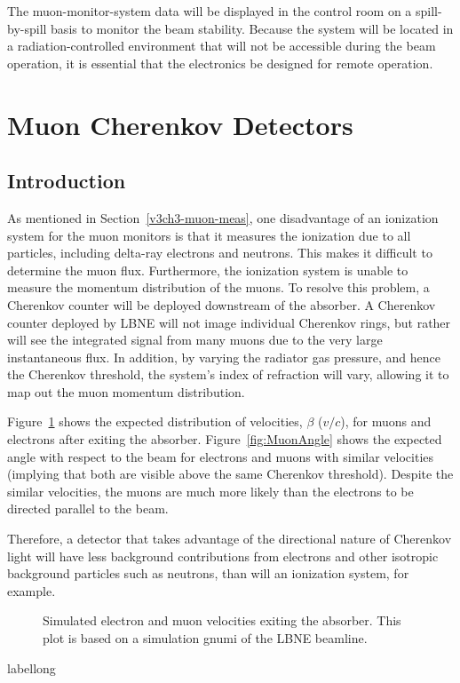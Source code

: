 The muon-monitor-system data will be displayed in the control room on
a spill-by-spill basis to monitor the beam stability. Because the
system will be located in a radiation-controlled environment that will
not be accessible during the beam operation, it is essential that the
electronics be designed for remote operation.

%
%
\section{Muon Cherenkov Detectors} %
\label{v3ch3-mu-ch-det}
\subsection{Introduction}

As mentioned in Section~\ref{v3ch3-muon-meas}, one disadvantage of an ionization system for the
muon monitors is that it measures the ionization due to all
particles, including delta-ray electrons and neutrons. This makes it
difficult to determine the muon flux.  Furthermore, the ionization
system is unable to measure the momentum distribution of the
muons. To resolve this problem, a Cherenkov
counter will be deployed downstream of the absorber.  A Cherenkov counter deployed by LBNE
will not image individual Cherenkov rings, but rather will see the
integrated signal from many muons due to the very large instantaneous flux. 
In addition, by varying the radiator gas pressure, and hence the Cherenkov threshold, the system's index of refraction will vary, allowing it to map out the muon momentum distribution.


Figure~\ref{fig:MuonBeta} shows the expected distribution of
velocities, $\beta$ ($v/c$), for muons and electrons after exiting the
absorber. 
Figure~\ref{fig:MuonAngle} shows the expected angle with respect to the beam for
electrons and muons with similar velocities (implying that both are visible above the 
same Cherenkov threshold).  Despite the similar velocities, the muons are much more likely
than the electrons to be directed parallel to the beam.

Therefore, a detector that takes advantage of the directional nature of Cherenkov
light will have less background contributions from
electrons 
and other isotropic background particles such as neutrons, than will an ionization system, for example. 

\begin{figure}[htbp]
\begin{center}
\caption[Simulated electron and muon velocities upon exiting absorber]{Simulated electron and muon velocities 
exiting the absorber.
This plot is based on a 
simulation gnumi\cite{GNuMI} of the LBNE beamline.}
\label{fig:MuonBeta}
\end{center}
\end{figure}
\begin{cdrfigure}[short]{label}{long}
\end{cdrfigure}

